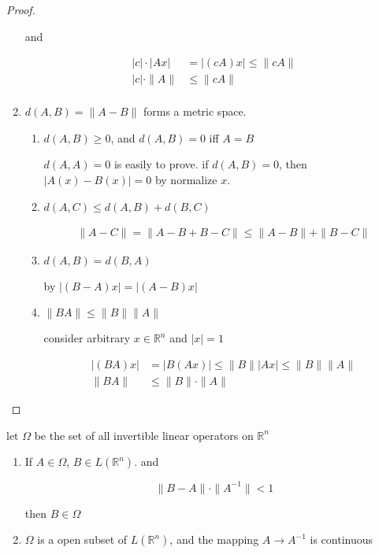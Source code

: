 \begin{proof}
\begin{enumerate}
    and

    \begin{align*}
        |c| \cdot |Ax| &= |(cA)x| \le \| c A\| \\
        |c|\cdot  \| A \| &\le\| c A\| \\
    \end{align*}

    \item $d(A,B) = \| A - B \|$ forms a metric space.
    
    \begin{enumerate}
        \item $d(A,B) \ge 0$, and $d(A,B) = 0$ iff $A = B$

        $d(A,A) = 0$ is easily to prove. if $d(A,B) = 0$, then $\left|A(x) - B(x)\right| = 0$ by
        normalize $x$.

        \item $d(A,C) \le d(A,B) + d(B,C)$

        \begin{align*}
            \| A - C\| = \| A - B + B - C \| \le \| A -B\| + \| B-C\|
        \end{align*}

        \item $d(A,B) = d(B,A)$

        by $|(B-A)x| = |(A-B)x|$

        \item $\| BA \| \le \| B \| \| A \|$

        consider arbitrary $x \in \mathbb{R}^n$ and $|x| = 1$

        \begin{align*}
            | (BA)x | &= | B(Ax) | \le \| B \| |Ax| \le \| B \| \|A \|  \\
            \| BA \| & \le \|B\| \cdot \|A\|
        \end{align*}
    \end{enumerate}

   \end{enumerate} 
\end{proof}

\begin{thm}
    let $\Omega$ be the set of all invertible linear operators on $\mathbb{R}^n$

    \begin{enumerate}
        \item If $A \in \Omega$, $B \in L(\mathbb{R}^n)$. and

        \[
            \| B - A\| \cdot \| A^{-1}\| < 1
        \]

        then $B \in \Omega$

    \item $\Omega$ is a open subset of $L(\mathbb{R}^n)$, and the mapping $A \to A^{-1}$ is continuous
    \end{enumerate}
\end{thm}

